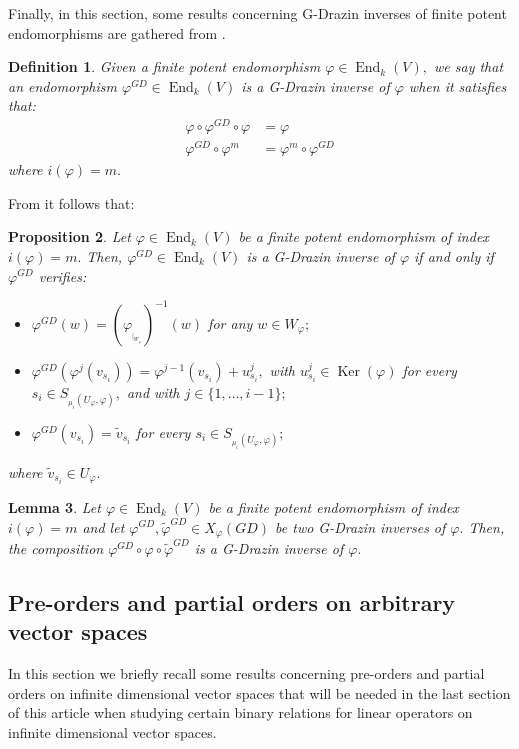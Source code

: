 \documentclass[10pt,a4paper]{amsart}
\newtheorem{defn}{Definition}
\newtheorem{lem}[defn]{Lemma}
\newtheorem{prop}[defn]{Proposition}
\theoremstyle{plain}
\theoremstyle{remark}
\numberwithin{equation}{section} \numberwithin{defn}{section}
\newcommand\ed{\operatorname{End}}
\newcommand\Ker{\operatorname{Ker}}
\newcommand{\f}{\varphi}
\begin{document}
Finally, in this section, some results concerning G-Drazin inverses of finite potent endomorphisms are gathered from \cite{FPGD}.

\begin{defn}\cite[Definition 3.1]{FPGD}\label{D: GDrazin fp}
Given a finite potent endomorphism $\f\in \ed_k(V),$ we say that an endomorphism $\f^{GD}\in \ed_k(V)$ is a G-Drazin inverse of $\f$ when it satisfies that: \begin{align*}
\f\circ \f^{GD}\circ \f &=\f\\
\f^{GD}\circ \f^m&=\f^m\circ \f^{GD}
\end{align*} where $i(\f)=m.$
\end{defn}

From \cite[Proposition 3.4]{FPGD} it follows that:


\begin{prop}\label{P: Charact GDrazinfp}
Let $\f\in \ed_k(V)$ be a finite potent endomorphism of index $i(\f)=m.$ Then, $\f^{GD}\in \ed_k(V)$ is a G-Drazin inverse of $\f$ if and only if $\f^{GD}$ verifies: \begin{itemize}
\item $\f^{GD}(w)=(\f_{_{\vert_{W_{\f}}}})^{-1}(w)$ for any $w\in W_{\f};$
\smallskip
\item $\f^{GD}(\f^j(v_{s_i}))=\f^{j-1}(v_{s_i})+u_{s_i}^j,$ with $u_{s_i}^j \in \Ker(\f)$ for every $s_i\in S_{_{\mu_i}(U_{\f},\f)},$ and with $j\in \{1,\dots, i-1\};$
\smallskip 
\item $\f^{GD}(v_{s_i})=\tilde{v}_{s_i}$ for every $s_i\in S_{_{\mu_i}(U_{\f},\f)};$ 
\end{itemize} where $\tilde{v}_{s_i}\in U_{\f}.$
\end{prop}

\begin{lem}\cite[Lemma 6.2]{RendDaa}\label{P: CompG-Drazin}
Let $\f \in \ed_k(V)$ be a finite potent endomorphism of index $i(\f)=m$ and let $\f^{GD},\tilde{\f}^{GD}\in X_{\f}(GD)$ be two G-Drazin inverses of $\f .$ Then, the composition $\f^{GD}\circ \f \circ \tilde{\f}^{GD}$ is a G-Drazin inverse of $\f .$ 
\end{lem}

\subsection{Pre-orders and partial orders on arbitrary vector spaces}\label{ss: Pre and PO}
In this section we briefly recall some results concerning pre-orders and partial orders on infinite dimensional vector spaces that will be needed in the last section of this article when studying certain binary relations for linear operators on infinite dimensional vector spaces.
\end{document}
